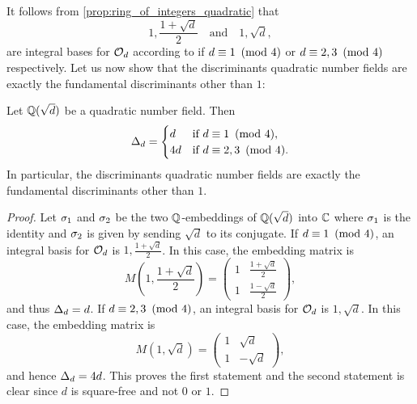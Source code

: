     It follows from \cref{prop:ring_of_integers_quadratic} that
    \[
      1,\frac{1+\sqrt{d}}{2} \quad \text{and} \quad 1,\sqrt{d},
    \]
    are integral bases for $\mathcal{O}_{d}$ according to if $d \equiv 1 \ \left(\text{mod }4\right)$ or $d \equiv 2,3 \ \left(\text{mod }4\right)$ respectively. Let us now show that the discriminants quadratic number fields are exactly the fundamental discriminants other than $1$:

    \begin{proposition}\label{prop:discriminant_quadratic}
      Let $\mathbb{Q}(\sqrt{d})$ be a quadratic number field. Then
      \[
        \Delta_{d} = \begin{cases} d & \text{if $d \equiv 1 \ \left(\text{mod }4\right)$}, \\ 4d & \text{if $d \equiv 2,3 \ \left(\text{mod }4\right)$}. \end{cases}
      \]
      In particular, the discriminants quadratic number fields are exactly the fundamental discriminants other than $1$.
    \end{proposition}
    \begin{proof}
      Let $\sigma_{1}$ and $\sigma_{2}$ be the two $\mathbb{Q}$-embeddings of $\mathbb{Q}(\sqrt{d})$ into $\mathbb{C}$ where $\sigma_{1}$ is the identity and $\sigma_{2}$ is given by sending $\sqrt{d}$ to its conjugate. If $d \equiv 1 \ \left(\text{mod }4\right)$, an integral basis for $\mathcal{O}_{d}$ is $1,\frac{1+\sqrt{d}}{2}$. In this case, the embedding matrix is
      \[
        M\left(1,\frac{1+\sqrt{d}}{2}\right) = \begin{pmatrix} 1 & \frac{1+\sqrt{d}}{2} \\ 1 & \frac{1-\sqrt{d}}{2} \end{pmatrix},
      \]
      and thus $\Delta_{d} = d$. If $d \equiv 2,3 \ \left(\text{mod }4\right)$, an integral basis for $\mathcal{O}_{d}$ is $1,\sqrt{d}$. In this case, the embedding matrix is
      \[
        M(1,\sqrt{d}) = \begin{pmatrix} 1 & \sqrt{d} \\ 1 & -\sqrt{d} \end{pmatrix},
      \]
      and hence $\Delta_{d} = 4d$. This proves the first statement and the second statement is clear since $d$ is square-free and not $0$ or $1$.
    \end{proof}

